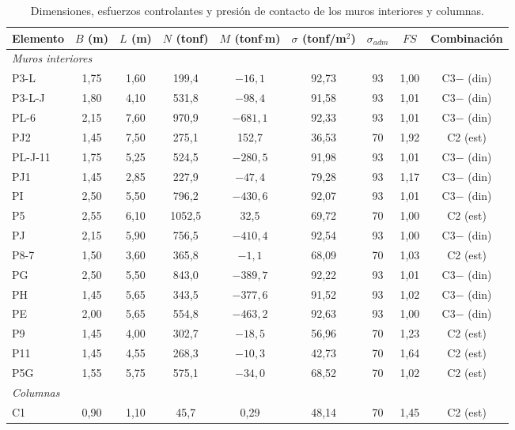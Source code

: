 \begin{table}[H]
\centering
\footnotesize
\setlength{\tabcolsep}{4pt}
\caption{Dimensiones, esfuerzos controlantes y presión de contacto de los muros interiores y columnas.}
\label{tab:dimpres}
\begin{tabular}{lcccccccc}
\hline
Elemento & $B$ (m) & $L$ (m) & $N$ (tonf) & $M$ (tonf$\cdot$m) & $\sigma$ (tonf/m$^2$) & $\sigma_{adm}$ & $FS$ & Combinación \\
\hline
\multicolumn{9}{l}{\textit{Muros interiores}} \\
\hline
P3-L    & 1,75 & 1,60  & 199,4  & $-16,1$  & 92,73 & 93 & 1,00 & C3$-$ (din) \\
P3-L-J  & 1,80 & 4,10  & 531,8  & $-98,4$  & 91,58 & 93 & 1,01 & C3$-$ (din) \\
PL-6    & 2,15 & 7,60  & 970,9  & $-681,1$ & 92,33 & 93 & 1,01 & C3$-$ (din) \\
PJ2     & 1,45 & 7,50  & 275,1  & 152,7  & 36,53 & 70 & 1,92 & C2 (est) \\
PL-J-11 & 1,75 & 5,25  & 524,5  & $-280,5$ & 91,98 & 93 & 1,01 & C3$-$ (din) \\
PJ1     & 1,45 & 2,85  & 227,9  & $-47,4$  & 79,28 & 93 & 1,17 & C3$-$ (din) \\
PI      & 2,50 & 5,50  & 796,2  & $-430,6$ & 92,07 & 93 & 1,01 & C3$-$ (din) \\
P5      & 2,55 & 6,10  & 1052,5 & 32,5   & 69,72 & 70 & 1,00 & C2 (est) \\
PJ      & 2,15 & 5,90  & 756,5  & $-410,4$ & 92,54 & 93 & 1,00 & C3$-$ (din) \\
P8-7    & 1,50 & 3,60  & 365,8  & $-1,1$   & 68,09 & 70 & 1,03 & C2 (est) \\
PG      & 2,50 & 5,50  & 843,0  & $-389,7$ & 92,22 & 93 & 1,01 & C3$-$ (din) \\
PH      & 1,45 & 5,65  & 343,5  & $-377,6$ & 91,52 & 93 & 1,02 & C3$-$ (din) \\
PE      & 2,00 & 5,65  & 554,8  & $-463,2$ & 92,63 & 93 & 1,00 & C3$-$ (din) \\
P9      & 1,45 & 4,00  & 302,7  & $-18,5$  & 56,96 & 70 & 1,23 & C2 (est) \\
P11     & 1,45 & 4,55  & 268,3  & $-10,3$  & 42,73 & 70 & 1,64 & C2 (est) \\
P5G     & 1,55 & 5,75  & 575,1  & $-34,0$  & 68,52 & 70 & 1,02 & C2 (est) \\
\hline
\multicolumn{9}{l}{\textit{Columnas}} \\
\hline
C1 & 0,90 & 1,10 & 45,7 & 0,29 & 48,14 & 70 & 1,45 & C2 (est) \\

\end{tabular}
\end{table}
